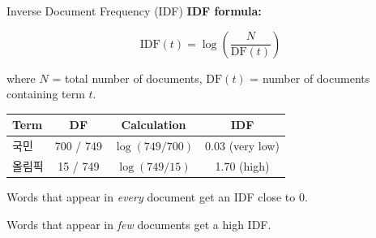\documentclass[aspectratio=169,11pt]{beamer}
\begin{document}
\begin{frame}{Inverse Document Frequency (IDF)}
    \textbf{IDF formula:}

    \vspace{0.2cm}

    $$\text{IDF}(t) = \log\!\left(\frac{N}{\text{DF}(t)}\right)$$

    \vspace{0.2cm}

    where $N$ = total number of documents, $\text{DF}(t)$ = number of documents containing term $t$.

    \vspace{0.4cm}

    \begin{center}
    \begin{tabular}{@{} l c c c @{}}
        \toprule
        \textbf{Term} & \textbf{DF} & \textbf{Calculation} & \textbf{IDF} \\
        \midrule
        국민 & 700 / 749 & $\log(749/700)$ & 0.03 (very low) \\
        올림픽 & 15 / 749 & $\log(749/15)$ & 1.70 (high) \\
        \bottomrule
    \end{tabular}
    \end{center}

    \vspace{0.3cm}

    Words that appear in \textit{every} document get an IDF close to 0.

    Words that appear in \textit{few} documents get a high IDF.
\end{frame}
\end{document}
